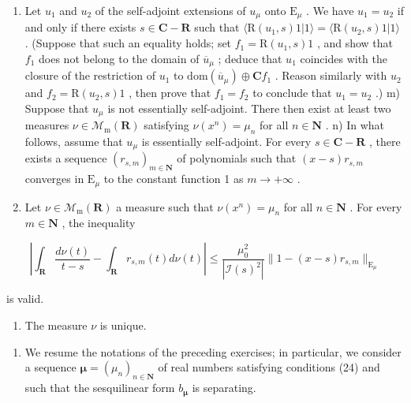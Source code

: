 \begin{enumerate}
\def\labelenumi{\alph{enumi})}
\setcounter{enumi}{11}
\item
  Let \(u_1\) and \(u_2\) of the self-adjoint extensions of \(u_\mu\) onto \(\mathrm{E}_\mu\) . We have \(u_1 = u_2\) if and only if there exists \(s \in \mathbf{C} - \mathbf{R}\) such that \(\langle \mathrm{R}(u_1, s)1|1\rangle = \langle \mathrm{R}(u_2, s)1|1\rangle\) . (Suppose that such an equality holds; set \(f_1 = \mathrm{R}(u_1, s)1\) , and show that \(f_1\) does not belong to the domain of \(\overline{u}_\mu\) ; deduce that \(u_1\) coincides with the closure of the restriction of \(u_1\) to \(\mathrm{dom}(\overline{u}_\mu) \oplus \mathbf{C}f_1\) . Reason similarly with \(u_2\) and \(f_2 = \mathrm{R}(u_2, s)1\) , then prove that \(f_1 = f_2\) to conclude that \(u_1 = u_2\) .) m) Suppose that \(u_\mu\) is not essentially self-adjoint. There then exist at least two measures \(\nu \in \mathcal{M}_{\mathrm{m}}(\mathbf{R})\) satisfying \(\nu(x^n) = \mu_n\) for all \(n \in \mathbf{N}\) . n) In what follows, assume that \(u_\mu\) is essentially self-adjoint. For every \(s \in \mathbf{C} - \mathbf{R}\) , there exists a sequence \((r_{s,m})_{m \in \mathbf{N}}\) of polynomials such that \((x - s)r_{s,m}\) converges in \(\mathrm{E}_\mu\) to the constant function 1 as \(m \to +\infty\) .
\item
  Let \(\nu\in\mathcal{M}_{\mathrm{m}}(\mathbf{R})\) a measure such that \(\nu(x^{n})=\mu_{n}\) for all \(n\in\mathbf{N}\) . For every \(m\in\mathbf{N}\) , the inequality
\end{enumerate}

\[
\left| \int_ {\mathbf {R}} \frac {d \nu (t)}{t - s} - \int_ {\mathbf {R}} r _ {s, m} (t) d \nu (t) \right| \leqslant \frac {\mu_ {0} ^ {2}}{| \mathcal {I} (s) ^ {2} |} \| 1 - (x - s) r _ {s, m} \| _ {\mathrm{E} _ {\mu}}
\]

is valid.

\begin{enumerate}
\def\labelenumi{\alph{enumi})}
\setcounter{enumi}{15}
\tightlist
\item
  The measure \(\nu\) is unique.
\end{enumerate}

\begin{enumerate}
\def\labelenumi{\arabic{enumi})}
\setcounter{enumi}{23}
\tightlist
\item
  We resume the notations of the preceding exercises; in particular, we consider a sequence \(\boldsymbol{\mu} = (\mu_n)_{n\in \mathbf{N}}\) of real numbers satisfying conditions (24) and such that the sesquilinear form \(b_{\boldsymbol{\mu}}\) is separating.
\end{enumerate}

